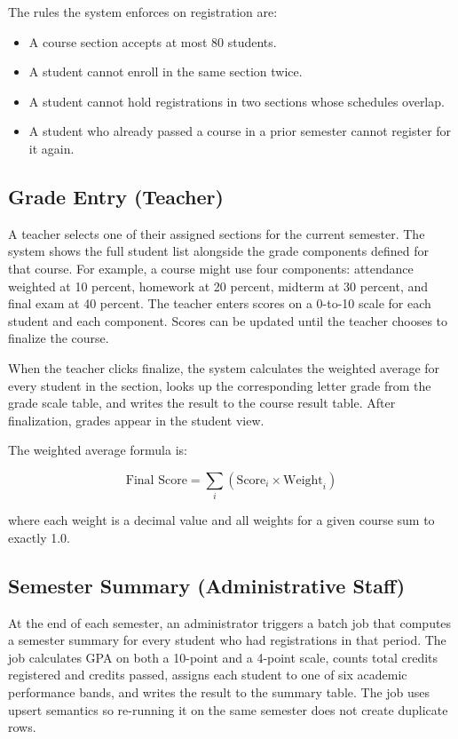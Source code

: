 \documentclass[12pt,a4paper]{report}
\begin{document}
The rules the system enforces on registration are:

\begin{itemize}
  \item A course section accepts at most 80 students.
  \item A student cannot enroll in the same section twice.
  \item A student cannot hold registrations in two sections whose schedules overlap.
  \item A student who already passed a course in a prior semester cannot register for it again.
\end{itemize}

\subsection{Grade Entry (Teacher)}

A teacher selects one of their assigned sections for the current semester. The system shows the full student list alongside the grade components defined for that course. For example, a course might use four components: attendance weighted at 10 percent, homework at 20 percent, midterm at 30 percent, and final exam at 40 percent. The teacher enters scores on a 0-to-10 scale for each student and each component. Scores can be updated until the teacher chooses to finalize the course.

When the teacher clicks finalize, the system calculates the weighted average for every student in the section, looks up the corresponding letter grade from the grade scale table, and writes the result to the course result table. After finalization, grades appear in the student view.

The weighted average formula is:

\[
  \text{Final Score} = \sum_{i} \left( \text{Score}_i \times \text{Weight}_i \right)
\]

where each weight is a decimal value and all weights for a given course sum to exactly 1.0.

\subsection{Semester Summary (Administrative Staff)}

At the end of each semester, an administrator triggers a batch job that computes a semester summary for every student who had registrations in that period. The job calculates GPA on both a 10-point and a 4-point scale, counts total credits registered and credits passed, assigns each student to one of six academic performance bands, and writes the result to the summary table. The job uses upsert semantics so re-running it on the same semester does not create duplicate rows.
\end{document}
